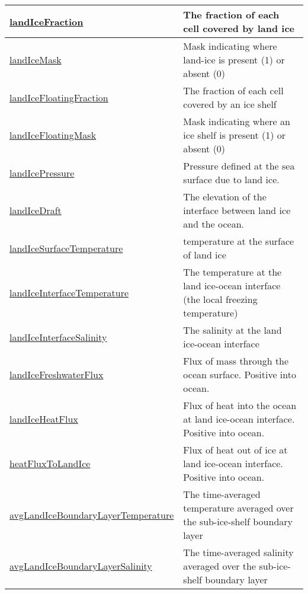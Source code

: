 {\begin{center}
\begin{longtable}{| p{2.0in} | p{4.0in} |}
    \hline
    \hyperref[subsec:var_sec_forcing_landIceFraction]{landIceFraction} & The fraction of each cell covered by land ice \\
    \hline
    \hyperref[subsec:var_sec_forcing_landIceMask]{landIceMask} & Mask indicating where land-ice is present (1) or absent (0) \\
    \hline
    \hyperref[subsec:var_sec_forcing_landIceFloatingFraction]{landIceFloatingFraction} & The fraction of each cell covered by an ice shelf \\
    \hline
    \hyperref[subsec:var_sec_forcing_landIceFloatingMask]{landIceFloatingMask} & Mask indicating where an ice shelf is present (1) or absent (0) \\
    \hline
    \hyperref[subsec:var_sec_forcing_landIcePressure]{landIcePressure} & Pressure defined at the sea surface due to land ice. \\
    \hline
    \hyperref[subsec:var_sec_forcing_landIceDraft]{landIceDraft} & The elevation of the interface between land ice and the ocean. \\
    \hline
    \hyperref[subsec:var_sec_forcing_landIceSurfaceTemperature]{landIceSurfaceTemperature} & temperature at the surface of land ice \\
    \hline
    \hyperref[subsec:var_sec_forcing_landIceInterfaceTemperature]{landIceInterfaceTemperature} & The temperature at the land ice-ocean interface (the local freezing temperature) \\
    \hline
    \hyperref[subsec:var_sec_forcing_landIceInterfaceSalinity]{landIceInterfaceSalinity} & The salinity at the land ice-ocean interface \\
    \hline
    \hyperref[subsec:var_sec_forcing_landIceFreshwaterFlux]{landIceFreshwaterFlux} & Flux of mass through the ocean surface. Positive into ocean. \\
    \hline
    \hyperref[subsec:var_sec_forcing_landIceHeatFlux]{landIceHeatFlux} & Flux of heat into the ocean at land ice-ocean interface. Positive into ocean. \\
    \hline
    \hyperref[subsec:var_sec_forcing_heatFluxToLandIce]{heatFluxToLandIce} & Flux of heat out of ice at land ice-ocean interface. Positive into ocean. \\
    \hline
    \hyperref[subsec:var_sec_forcing_avgLandIceBoundaryLayerTemperature]{avgLandIceBoundaryLayer\-Temperature} & The time-averaged temperature averaged over the sub-ice-shelf boundary layer \\
    \hline
    \hyperref[subsec:var_sec_forcing_avgLandIceBoundaryLayerSalinity]{avgLandIceBoundaryLayer\-Salinity} & The time-averaged salinity averaged over the sub-ice-shelf boundary layer \\

\end{longtable}
\end{center}}
